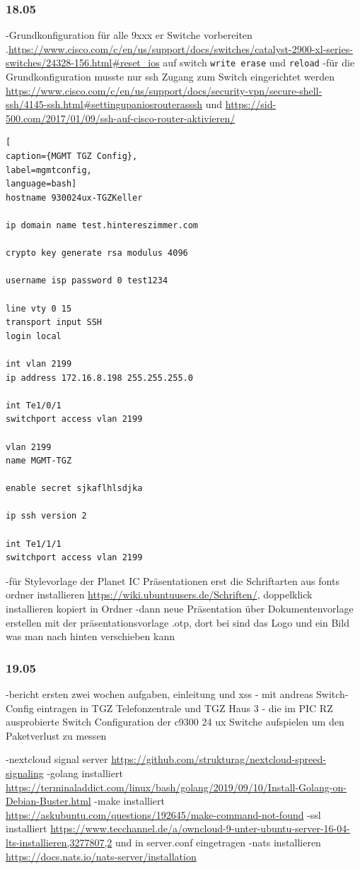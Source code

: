 \documentclass[english,runningheads,a4paper]{llncs}[2018/03/10]
\begin{document}
\subsubsection{18.05}
-Grundkonfiguration für alle 9xxx er Switche vorbereiten
.\url{https://www.cisco.com/c/en/us/support/docs/switches/catalyst-2900-xl-series-switches/24328-156.html#reset_ios} auf switch \texttt{write erase} und \texttt{reload}
-für die Grundkonfiguration musste nur ssh Zugang zum Switch eingerichtet werden \url{https://www.cisco.com/c/en/us/support/docs/security-vpn/secure-shell-ssh/4145-ssh.html#settingupaniosrouterasssh} und \url{https://sid-500.com/2017/01/09/ssh-auf-cisco-router-aktivieren/}
\begin{lstlisting}[
caption={MGMT TGZ Config},
label=mgmtconfig,
language=bash]
hostname 930024ux-TGZKeller

ip domain name test.hintereszimmer.com

crypto key generate rsa modulus 4096

username isp password 0 test1234

line vty 0 15
transport input SSH
login local

int vlan 2199
ip address 172.16.8.198 255.255.255.0

int Te1/0/1
switchport access vlan 2199

vlan 2199
name MGMT-TGZ

enable secret sjkaflhlsdjka

ip ssh version 2

int Te1/1/1 
switchport access vlan 2199
\end{lstlisting}
-für Stylevorlage der Planet IC Präsentationen erst die Schriftarten aus fonts ordner installieren \url{https://wiki.ubuntuusers.de/Schriften/}, doppelklick installieren kopiert in Ordner 
-dann neue Präsentation über Dokumentenvorlage erstellen mit der präsentationsvorlage .otp, dort bei  sind das Logo und ein Bild was man nach hinten verschieben kann
\subsubsection{19.05}
-bericht ersten zwei wochen aufgaben, einleitung und xss
- mit andreas Switch-Config eintragen in TGZ Telefonzentrale und TGZ Haus 3
- die im PIC RZ ausprobierte Switch Configuration der c9300 24 ux Switche aufspielen um den Paketverlust zu messen

-nextcloud signal server \url{https://github.com/strukturag/nextcloud-spreed-signaling}
-golang installiert \url{https://terminaladdict.com/linux/bash/golang/2019/09/10/Install-Golang-on-Debian-Buster.html}
-make installiert \url{https://askubuntu.com/questions/192645/make-command-not-found}
-ssl installiert \url{https://www.tecchannel.de/a/owncloud-9-unter-ubuntu-server-16-04-lts-installieren,3277807,2} und in server.conf eingetragen
-nats installieren \url{https://docs.nats.io/nats-server/installation}
\end{document}
